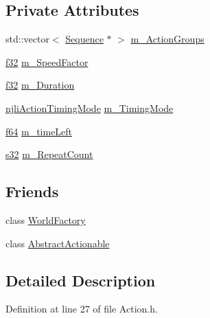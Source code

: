 \subsection*{Private Attributes}
\begin{DoxyCompactItemize}
\item 
std\+::vector$<$ \mbox{\hyperlink{structnjli_1_1_action_1_1_sequence}{Sequence}} $\ast$ $>$ \mbox{\hyperlink{classnjli_1_1_action_a12cae1b645280c6811d664183c63600b}{m\+\_\+\+Action\+Groups}}
\item 
\mbox{\hyperlink{_util_8h_a5f6906312a689f27d70e9d086649d3fd}{f32}} \mbox{\hyperlink{classnjli_1_1_action_a650426751b72971d7d92cf0edf3fc364}{m\+\_\+\+Speed\+Factor}}
\item 
\mbox{\hyperlink{_util_8h_a5f6906312a689f27d70e9d086649d3fd}{f32}} \mbox{\hyperlink{classnjli_1_1_action_a0e9ef8b9fb180016c4f4abec67ad8dac}{m\+\_\+\+Duration}}
\item 
\mbox{\hyperlink{namespacenjli_affc383078a5935be1509062828a1824b}{njli\+Action\+Timing\+Mode}} \mbox{\hyperlink{classnjli_1_1_action_a3ae742326e7c2cfdd86b816816256f3d}{m\+\_\+\+Timing\+Mode}}
\item 
\mbox{\hyperlink{_util_8h_a94dab5770726ccbef8c7d026cfbdf8e5}{f64}} \mbox{\hyperlink{classnjli_1_1_action_ab82c9d7ba3c11ef73b38f04a136cb87b}{m\+\_\+time\+Left}}
\item 
\mbox{\hyperlink{_util_8h_aa62c75d314a0d1f37f79c4b73b2292e2}{s32}} \mbox{\hyperlink{classnjli_1_1_action_a7407ab22c618d86062eb6455c8f071cf}{m\+\_\+\+Repeat\+Count}}
\end{DoxyCompactItemize}
\subsection*{Friends}
\begin{DoxyCompactItemize}
\item 
class \mbox{\hyperlink{classnjli_1_1_action_acb96ebb09abe8f2a37a915a842babfac}{World\+Factory}}
\item 
class \mbox{\hyperlink{classnjli_1_1_action_acae59ef0f73ad6fe5d30782b3054c2a0}{Abstract\+Actionable}}
\end{DoxyCompactItemize}


\subsection{Detailed Description}


Definition at line 27 of file Action.\+h.



